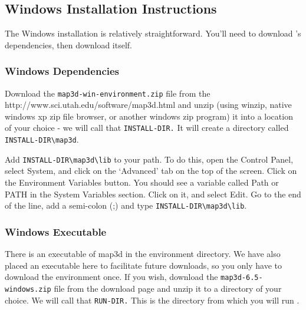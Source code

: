 \subsection{Windows Installation Instructions}
\label{sec:windows-install}

The Windows installation is relatively straightforward.  You'll need to 
download \map{}'s dependencies, then download \map{} itself.

\subsubsection{Windows Dependencies}

Download the \texttt{map3d-win-environment.zip} file from the \map{}
{http://www.sci.utah.edu/software/map3d.html} and unzip (using winzip,
native windows xp zip file browser, or another windows zip program) it into a location
of your choice - we will call that \texttt{INSTALL-DIR.}  It will create a
directory called \verb|INSTALL-DIR\map3d|.

Add \verb|INSTALL-DIR\map3d\lib| to your path.  To do this, open the
Control Panel, select System, and click on the `Advanced' tab on the top of
the screen.  Click on the Environment Variables button.  You should see a
variable called Path or PATH in the System Variables section.  Click on it,
and select Edit.  Go to the end of the line, add a semi-colon (;) and type
\verb|INSTALL-DIR\map3d\lib|.

\subsubsection{Windows Executable}

There is an executable of map3d in the environment directory.  We have also
placed an executable here to facilitate future downloads, so you only have
to download the environment once.  If you wish, download the
\texttt{map3d-6.5-windows.zip} file from the \map{} download page and unzip
it to a directory of your choice.  We will call that \texttt{RUN-DIR.} This
is the directory from which you will run \map{}.



